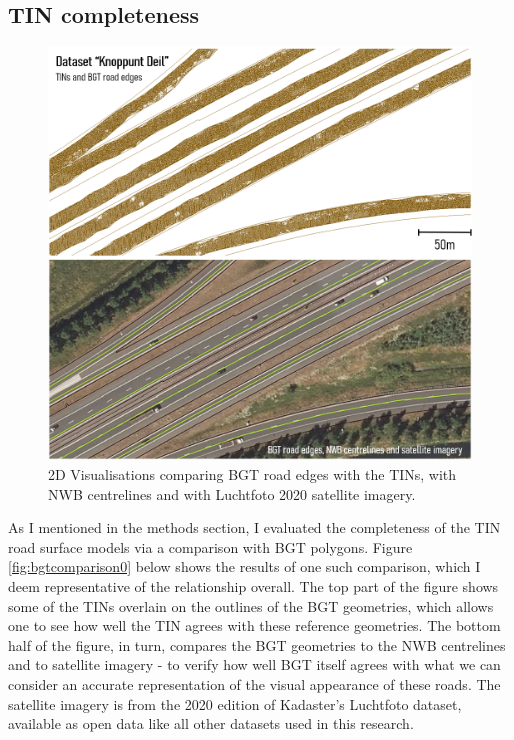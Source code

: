 \subsection{TIN completeness}
\label{sub:tincompleteness}

\begin{figure}[]
    \centering
    \includegraphics[width=0.9\linewidth]{final_report/figs/bgtcomparison.png}
    \caption{2D Visualisations comparing BGT road edges with the TINs, with NWB centrelines and with Luchtfoto 2020 satellite imagery.}
    \label{fig:bgtcomparison}
\end{figure}

As I mentioned in the methods section, I evaluated the completeness of the TIN road surface models via a comparison with BGT polygons. Figure \ref{fig:bgtcomparison0} below shows the results of one such comparison, which I deem representative of the relationship overall. The top part of the figure shows some of the TINs overlain on the outlines of the BGT geometries, which allows one to see how well the TIN agrees with these reference geometries. The bottom half of the figure, in turn, compares the BGT geometries to the NWB centrelines and to satellite imagery - to verify how well BGT itself agrees with what we can consider an accurate representation of the visual appearance of these roads. The satellite imagery is from the 2020 edition of Kadaster's Luchtfoto dataset, available as open data like all other datasets used in this research.

